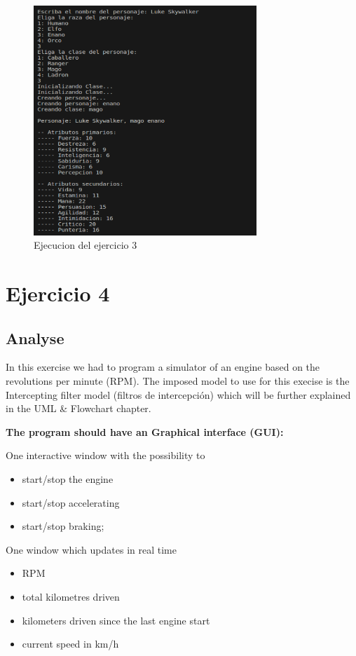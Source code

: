 \documentclass{article}
\begin{document}
\begin{figure}[h]
	\centering
        \vspace{15pt}
	\includegraphics[width=0.75\textwidth]{DS_ejecucion_ej3.png}
	\caption{Ejecucion del ejercicio 3}
	\label{fig:ejecucion_ej3}
\end{figure}

\newpage
\section{Ejercicio 4}
\subsection{Analyse}
In this exercise we had to program a simulator of an engine based on the revolutions per minute (RPM). The imposed model to use for this execise is the Intercepting filter model (filtros de intercepción) which will be further explained in the UML & Flowchart chapter. 
\vspace{15pt}
\item \textbf{The program should have an Graphical interface (GUI):} 
\item One interactive window with the possibility to
\begin{itemize}
   
\item start/stop the engine 
\item start/stop accelerating 
\item start/stop braking;
\end{itemize}
 \item One window which updates in real time 
 \begin{itemize}
     \item RPM 
     \item total kilometres driven 
     \item kilometers driven since the last engine start 
     \item current speed in km/h
 \end{itemize}
 
\end{document}
